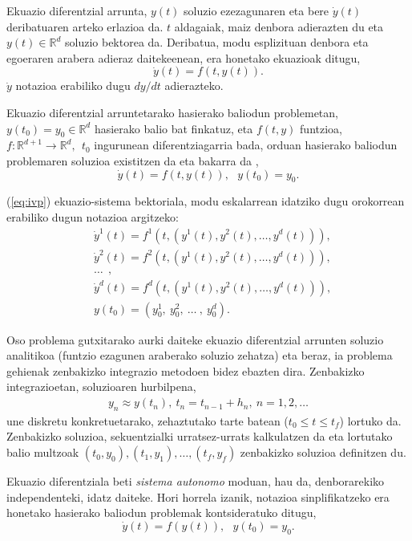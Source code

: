Ekuazio diferentzial arrunta, $y(t)$ soluzio ezezagunaren eta bere $\dot{y}(t)$ deribatuaren arteko erlazioa da. $t$ aldagaiak, maiz denbora adierazten du eta $y(t) \in \mathbb{R}^{d}$ soluzio bektorea da. Deribatua, modu esplizituan denbora eta egoeraren arabera  adieraz daitekeenean, era honetako ekuazioak ditugu,
\begin{equation}
 \label{eq:201}
\dot{y}(t)=f(t,y(t)). 
\end{equation} 
$\dot{y}$ notazioa erabiliko dugu $dy/dt$ adierazteko.

Ekuazio diferentzial arruntetarako hasierako baliodun problemetan,  $y(t_0)=y_0 \in \mathbb{R}^d$ hasierako balio bat finkatuz, eta $f(t,y)$ funtzioa, $f: \mathbb{R}^{d+1} \longrightarrow \mathbb{R}^d, \ \ t_0$ ingurunean diferentziagarria bada, orduan hasierako baliodun problemaren soluzioa existitzen da eta bakarra da \cite{Hairer2006},
\begin{equation}
 \label{eq:ivp}
\dot{y}(t)=f(t,y(t)), \ \ \ y(t_0)=y_0.
\end{equation} 

(\ref{eq:ivp}) ekuazio-sistema bektoriala, modu eskalarrean idatziko dugu orokorrean erabiliko dugun notazioa argitzeko:
\begin{align*}
&\dot{y}^1(t)=f^1(t,(y^1(t),y^2(t),\ldots,y^d(t))), \\
&\dot{y}^2(t)=f^2(t,(y^1(t),y^2(t),\ldots,y^d(t))), \\
&\ldots\ \ ,\\
&\dot{y}^d(t)=f^d(t,(y^1(t),y^2(t),\ldots,y^d(t))),  \\
& y(t_0)=(y_{0}^1,\ y_{0}^2,\ \ldots \ , \ y_{0}^d).
\end{align*}


Oso problema gutxitarako aurki daiteke ekuazio diferentzial arrunten soluzio analitikoa (funtzio ezagunen araberako soluzio zehatza) eta beraz, ia problema gehienak zenbakizko integrazio metodoen bidez ebazten dira.
Zenbakizko integrazioetan, soluzioaren hurbilpena,
\begin{align*}
 y_n \approx y(t_n), \ t_n=t_{n-1}+h_n, \ n=1,2,\dots
\end{align*}
une diskretu konkretuetarako, zehaztutako tarte batean ($t_0\le t \le t_f$) lortuko da. Zenbakizko soluzioa, sekuentzialki urratsez-urrats kalkulatzen da eta lortutako balio  multzoak $(t_0,y_0),(t_1,y_1),\dots,(t_f,y_f)$ zenbakizko soluzioa definitzen du.   

Ekuazio diferentziala beti \emph{sistema autonomo} moduan, hau da, denborarekiko independenteki, idatz daiteke. Hori horrela izanik, notazioa sinplifikatzeko era honetako hasierako baliodun problemak kontsideratuko ditugu,   
\begin{equation}
\label{eq:autonomo}
\dot{y}(t)=f(y(t)),\ \ \ y(t_0)=y_0.
\end{equation}

